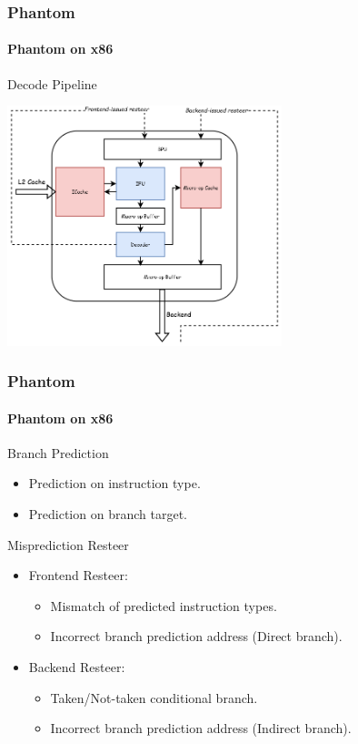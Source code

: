 \documentclass{beamer}
\begin{document}
\begin{frame}
    \frametitle{Phantom}
    \framesubtitle{Phantom on x86}
    Decode Pipeline
    \begin{center}
        \includegraphics[width=0.6\textwidth]{Figure/decode pipeline.png}
    \end{center}
\end{frame}

\begin{frame}
    \frametitle{Phantom}
    \framesubtitle{Phantom on x86}
    Branch Prediction
    \begin{itemize}
        \item Prediction on instruction type.
        \item Prediction on branch target.
    \end{itemize}
    
    Misprediction Resteer
    \begin{itemize}
        \item Frontend Resteer:
            \begin{itemize}
                \item Mismatch of predicted instruction types.
                \item Incorrect branch prediction address (Direct branch).
            \end{itemize}
            
        \item Backend Resteer:
            \begin{itemize}
                \item Taken/Not-taken conditional branch.
                \item Incorrect branch prediction address (Indirect branch).
            \end{itemize}
    \end{itemize}
\end{frame}
\end{document}
